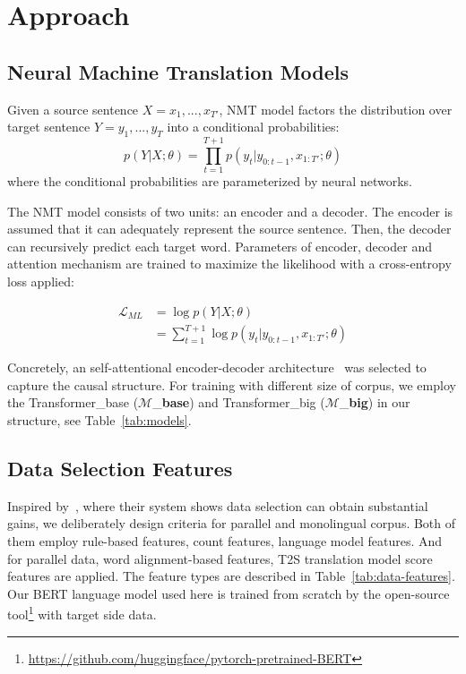 \documentclass[11pt,a4paper]{article}
\begin{document}
\section{Approach}
\label{sec:app}

\subsection{Neural Machine Translation Models}
\label{ssec:nmt}

Given a source sentence $X={x_1,...,x_{T'}}$, NMT model factors the distribution over target sentence $Y={y_1,...,y_T}$ into a conditional probabilities:
\begin{equation}
    p(Y|X;\theta)=\prod_{t=1}^{T+1} p(y_t|y_{0:t-1},x_{1:T'};\theta)
\end{equation}
where the conditional probabilities are parameterized by neural networks. 

The NMT model consists of two units: an encoder and a decoder. The encoder is assumed that it can adequately represent the source sentence. Then, the decoder can recursively predict each target word. Parameters of encoder, decoder and attention mechanism are trained to maximize the likelihood with a cross-entropy loss applied:

\begin{equation}
\begin{aligned}
    \mathcal{L}_{ML} &= \log p(Y|X;\theta)
    \\
    {} &= \sum_{t=1}^{T+1}\log p(y_t|y_{0:t-1},x_{1:T'};\theta)
\end{aligned}
\end{equation}

Concretely, an self-attentional encoder-decoder architecture~\cite{transformer} was selected to capture the causal structure. For training with different size of corpus, we employ the Transformer\_base ($\mathcal{M}$\_{\textbf{base}}) and Transformer\_big ($\mathcal{M}$\_{\textbf{big}}) in our structure, see Table~\ref{tab:models}.


\subsection{Data Selection Features}
\label{ssec:data}

Inspired by~\cite{bei-etal-2018-empirical}, where their system shows data selection can obtain substantial gains, we deliberately design criteria for parallel and monolingual corpus. Both of them employ rule-based features, count features, language model features. And for parallel data, word alignment-based features, T2S translation model score features are applied. The feature types are described in Table~\ref{tab:data-features}. Our BERT language model used here is trained from scratch by the open-source tool\footnote{\url{https://github.com/huggingface/pytorch-pretrained-BERT}} with target side data.
\end{document}
